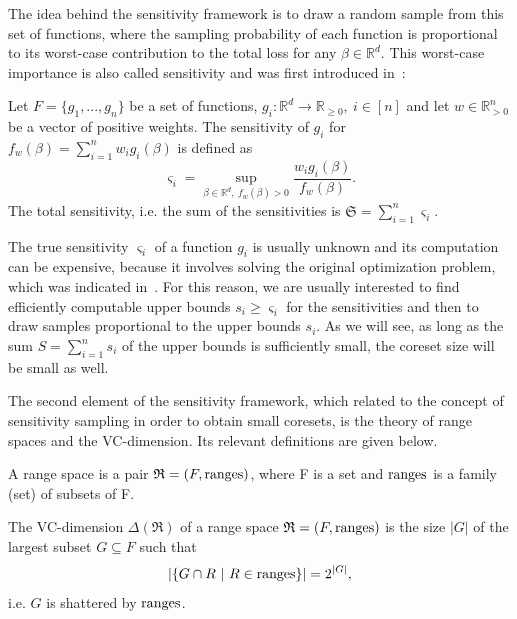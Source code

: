 The idea behind the sensitivity framework is to draw a random
sample from this set of functions, where the sampling probability
of each function is proportional to its worst-case
contribution to the total loss for any $\beta \in \mathbb{R}^d$.
This worst-case importance is also called sensitivity and was first
introduced in~\cite{langberg-schulman-sensitivities}:

\begin{definition}
    \label{def:sensitivity}
    Let $F = \{ g_1, ..., g_n \}$ be a set of functions,
    $g_i: \mathbb{R}^d \rightarrow \mathbb{R}_{\geq 0}, \ i \in [n]$
    and let $w \in \mathbb{R}^n_{>0}$ be a vector of positive weights.
    The sensitivity of $g_i$ for $f_w(\beta) = \sum_{i=1}^n w_i g_i(\beta)$ is defined as
    \begin{equation*}
        \varsigma_i = \sup_{\beta \in \mathbb{R}^d, \ f_w(\beta) > 0} \frac{w_i g_i(\beta)}{f_w(\beta)}.
    \end{equation*}
    The total sensitivity, i.e. the sum of the sensitivities is $\mathfrak{S} = \sum_{i=1}^n \varsigma_i$.
\end{definition}

The true sensitivity $\varsigma_i$ of a function $g_i$ is usually unknown
and its computation can be expensive, because it involves solving the
original optimization problem, which was indicated in~\cite{braverman-feldman-coresets}.
For this reason, we are usually interested to find efficiently computable
upper bounds $s_i \geq \varsigma_i$ for the sensitivities and then
to draw samples proportional to the upper bounds $s_i$.
As we will see, as long as the sum $S = \sum_{i=1}^n s_i$ of the upper
bounds is sufficiently small, the coreset size will be small as well.

The second element of the sensitivity framework, which
\cite{feldman-langberg-coresets} related to the
concept of sensitivity sampling in order to obtain small coresets,
is the theory of range spaces and the VC-dimension.
Its relevant definitions are given below.

\begin{definition}
    A range space is a pair $\mathfrak{R} = (F, \textup{ranges})$, where F is a set
    and $\textup{ranges}$ is a family (set) of subsets of F.
\end{definition}

\begin{definition}
    The VC-dimension $\Delta(\mathfrak{R})$ of a range space
    $\mathfrak{R} = (F, \textup{ranges})$ is
    the size $|G|$ of the largest subset $G \subseteq F$ such that
    \begin{equation*}
        \left| \left\{ G \cap R \ | \ R \in \textup{ranges} \right\} \right|
        = 2^{|G|},
    \end{equation*}
    i.e. $G$ is shattered by $\textup{ranges}$.
\end{definition}

